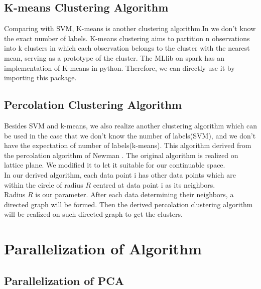 \documentclass[a4paper]{article}
\begin{document}
\subsection{K-means Clustering Algorithm}

Comparing with SVM, K-means is another clustering algorithm.In  we don't know the exact number of labels.  K-means clustering aims to partition n observations into k clusters in which each observation belongs to the cluster with the nearest mean, serving as a prototype of the cluster.
The MLlib on spark has an implementation of K-means in python. Therefore, we can directly use it by importing this package. 


\subsection{Percolation Clustering Algorithm}

Besides SVM and k-means, we also realize another clustering algorithm which can be used in the case that we don't know the number of labels(SVM), and we don't have the expectation of number of labels(k-means). This algorithm derived from the percolation algorithm of Newman \cite{}.  The original algorithm is realized on lattice plane. We modified it to let it suitable for our continuable space. \\
In our derived algorithm, each data point i has other data points which are within the circle of radius  $R$ centred at data point i as its neighbors.\\
Radius $R$ is our parameter. After each data determining their neighbors, a directed graph will be formed. Then the derived percolation clustering algorithm will be realized on such directed graph to get the clusters. 

\section{Parallelization of Algorithm}

\subsection{Parallelization of PCA}
\end{document}
